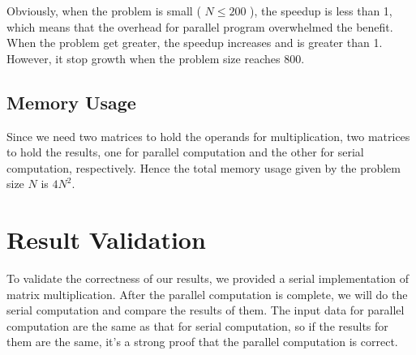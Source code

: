 \documentclass[12pt]{article}
\begin{document}
Obviously, when the problem is small ( $N \le 200$ ), the speedup 
is less than 1, which means that the overhead for parallel program 
overwhelmed the benefit. When the problem get greater, the speedup
increases and is greater than 1. However, it stop growth when the 
problem size reaches 800. 

\subsection{Memory Usage}
Since we need two matrices to hold the operands for 
multiplication, two matrices to hold the results, one for 
parallel computation and the other for serial computation, 
respectively. Hence the total memory usage given by the 
problem size $N$ is $4N^{2}$.

\section{Result Validation}
To validate the correctness of our results, we provided a serial
implementation of matrix multiplication. After the parallel 
computation is complete, we will do the serial computation and
compare the results of them. The input data for parallel 
computation are the same as that for serial computation, so if 
the results for them are the same, it's a strong proof that 
the parallel computation is correct.
\end{document}
